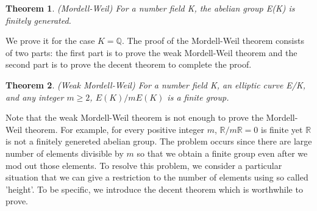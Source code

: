 \documentclass[12pt]{article}
\newcommand{\<}{\langle}
\renewcommand{\>}{\rangle}
\numberwithin{equation}{section}
\theoremstyle{plain}
\newtheorem{thm}{Theorem}[section]
\theoremstyle{definition}
\begin{document}
\begin{thm} 
    (Mordell-Weil) For a number field K, the abelian group E(K) is finitely generated.
\end{thm}

We prove it for the case \(K = \mathbb{Q}\). The proof of the Mordell-Weil theorem consists of two parts: the first part is to prove the weak Mordell-Weil theorem and the second part is to prove the decent theorem to complete the proof.

\begin{thm}
    (Weak Mordell-Weil) For a number field K, an elliptic curve E/K, and any integer \(m \geq 2\), \(E(K)/mE(K)\) is a finite group. 
\end{thm}

Note that the weak Mordell-Weil theorem is not enough to prove the Mordell-Weil theorem. For example, for every positive integer \(m\), \(\mathbb{R}/m\mathbb{R}=0\) is finite yet \( \mathbb{R} \) is not a finitely genereted abelian group. The problem occurs since there are large number of elements divisible by \(m\) so that we obtain a finite group even after we mod out those elements. To resolve this problem, we consider a particular situation that we can give a restriction to the number of elements using so called 'height'. To be specific, we introduce the decent theorem which is worthwhile to prove.
\end{document}
